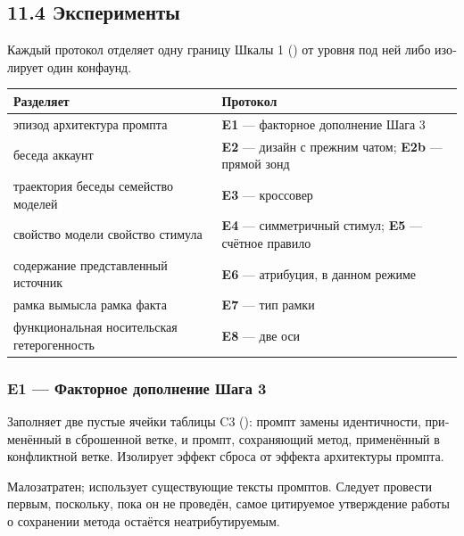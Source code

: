 \begin{russian}
\subsection*{11.4 Эксперименты}
\label{sec:ru:11.4}

Каждый протокол отделяет одну границу Шкалы 1 () от уровня под ней либо изолирует один конфаунд.

\begin{center}
\small
\begin{tabularx}{\linewidth}{>{\raggedright\arraybackslash}X>{\raggedright\arraybackslash}X}
\toprule
\textbf{Разделяет} & \textbf{Протокол} \\
\midrule
эпизод \gharr{} архитектура промпта & \textbf{E1} — факторное дополнение Шага 3 \\
беседа \gharr{} аккаунт & \textbf{E2} — дизайн с прежним чатом; \textbf{E2b} — прямой зонд \\
траектория беседы \gharr{} семейство моделей & \textbf{E3} — кроссовер \\
свойство модели \gharr{} свойство стимула & \textbf{E4} — симметричный стимул; \textbf{E5} — счётное правило \\
содержание \gharr{} представленный источник & \textbf{E6} — атрибуция, в данном режиме \\
рамка вымысла \gharr{} рамка факта & \textbf{E7} — тип рамки \\
функциональная \gharr{} носительская гетерогенность & \textbf{E8} — две оси \\
\bottomrule
\end{tabularx}
\end{center}

\subsubsection*{E1 — Факторное дополнение Шага 3}
\label{sec:ru:x-e1-3}

Заполняет две пустые ячейки таблицы C3 (): промпт замены идентичности, применённый в сброшенной ветке, и промпт, сохраняющий метод, применённый в конфликтной ветке. Изолирует эффект сброса от эффекта архитектуры промпта.

Малозатратен; использует существующие тексты промптов. Следует провести первым, поскольку, пока он не проведён, самое цитируемое утверждение работы о сохранении метода остаётся неатрибутируемым.



\end{russian}

